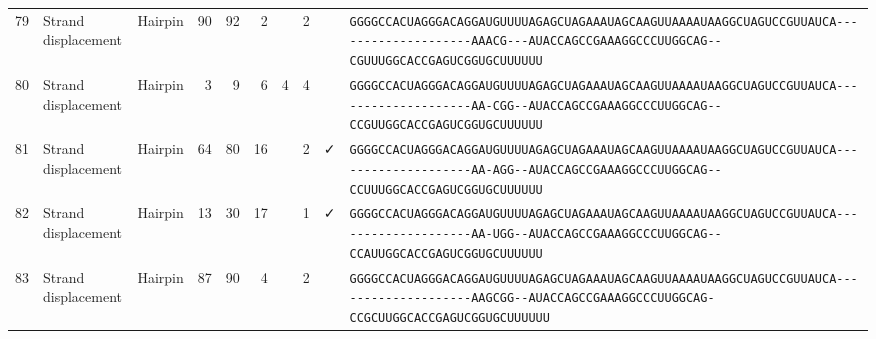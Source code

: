 \begin{tabular}{rllrrrrrcl}
 79 & Strand displacement & Hairpin & 90 & 92 & 2 &   & 2 &  &
 \color{ucsfdarkgrey}\verb|GGGGCCACUAGGGACAGGAU|\color{ucsforange}\verb|GUUUUA|\color{ucsfblue}\verb|GAGCUAGAAAUAGCAAGU|\color{ucsforange}\verb|UAAAAUAA|\color{ucsfnavy}\verb|GGCUAGUCCGU|\color{ucsforange}\verb|UAUCA|\color{ucsfteal}\verb|--------------------AAACG---|\color{ucsfpurple}\verb|AUACCAGCCGAAAGGCCCUUGGCAG|\color{ucsfteal}\verb|--CGUUU|\color{ucsforange}\verb|GGCACCGAGUCGGUGCUUUUUU| \\

 80 & Strand displacement & Hairpin & 3 & 9 & 6 & 4 & 4 &  &
 \color{ucsfdarkgrey}\verb|GGGGCCACUAGGGACAGGAU|\color{ucsforange}\verb|GUUUUA|\color{ucsfblue}\verb|GAGCUAGAAAUAGCAAGU|\color{ucsforange}\verb|UAAAAUAA|\color{ucsfnavy}\verb|GGCUAGUCCGU|\color{ucsforange}\verb|UAUCA|\color{ucsfteal}\verb|--------------------AA-CGG--|\color{ucsfpurple}\verb|AUACCAGCCGAAAGGCCCUUGGCAG|\color{ucsfteal}\verb|--CCGUU|\color{ucsforange}\verb|GGCACCGAGUCGGUGCUUUUUU| \\

 81 & Strand displacement & Hairpin & 64 & 80 & 16 &   & 2 & ✓ &
 \color{ucsfdarkgrey}\verb|GGGGCCACUAGGGACAGGAU|\color{ucsforange}\verb|GUUUUA|\color{ucsfblue}\verb|GAGCUAGAAAUAGCAAGU|\color{ucsforange}\verb|UAAAAUAA|\color{ucsfnavy}\verb|GGCUAGUCCGU|\color{ucsforange}\verb|UAUCA|\color{ucsfteal}\verb|--------------------AA-AGG--|\color{ucsfpurple}\verb|AUACCAGCCGAAAGGCCCUUGGCAG|\color{ucsfteal}\verb|--CCUUU|\color{ucsforange}\verb|GGCACCGAGUCGGUGCUUUUUU| \\

 82 & Strand displacement & Hairpin & 13 & 30 & 17 &  & 1 & ✓ &
 \color{ucsfdarkgrey}\verb|GGGGCCACUAGGGACAGGAU|\color{ucsforange}\verb|GUUUUA|\color{ucsfblue}\verb|GAGCUAGAAAUAGCAAGU|\color{ucsforange}\verb|UAAAAUAA|\color{ucsfnavy}\verb|GGCUAGUCCGU|\color{ucsforange}\verb|UAUCA|\color{ucsfteal}\verb|--------------------AA-UGG--|\color{ucsfpurple}\verb|AUACCAGCCGAAAGGCCCUUGGCAG|\color{ucsfteal}\verb|--CCAUU|\color{ucsforange}\verb|GGCACCGAGUCGGUGCUUUUUU| \\

 83 & Strand displacement & Hairpin & 87 & 90 & 4 &   & 2 &  &
 \color{ucsfdarkgrey}\verb|GGGGCCACUAGGGACAGGAU|\color{ucsforange}\verb|GUUUUA|\color{ucsfblue}\verb|GAGCUAGAAAUAGCAAGU|\color{ucsforange}\verb|UAAAAUAA|\color{ucsfnavy}\verb|GGCUAGUCCGU|\color{ucsforange}\verb|UAUCA|\color{ucsfteal}\verb|--------------------AAGCGG--|\color{ucsfpurple}\verb|AUACCAGCCGAAAGGCCCUUGGCAG|\color{ucsfteal}\verb|-CCGCUU|\color{ucsforange}\verb|GGCACCGAGUCGGUGCUUUUUU| \\


\end{tabular}
